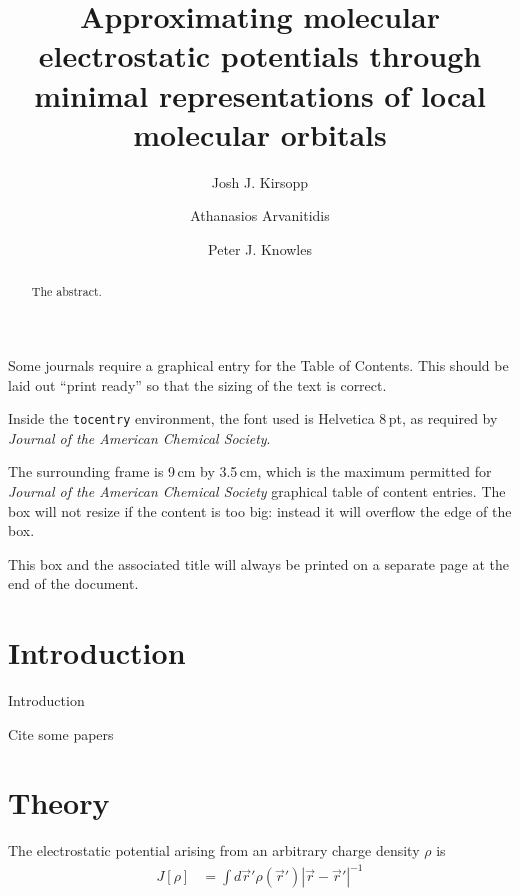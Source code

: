 \documentclass[journal=jacsat,manuscript=article]{achemso}
\author{Josh J. Kirsopp}
\author{Athanasios Arvanitidis}
\author{Peter J. Knowles}
\affiliation[Cardiff University]
{School of Chemistry, Cardiff University, Cardiff CF10 3AT, United Kingdom}
\title[Orbital-fitted density]
  {Approximating molecular electrostatic potentials through minimal representations of local molecular orbitals}
\begin{document}
\begin{tocentry}

Some journals require a graphical entry for the Table of Contents.
This should be laid out ``print ready'' so that the sizing of the
text is correct.

Inside the \texttt{tocentry} environment, the font used is Helvetica
8\,pt, as required by \emph{Journal of the American Chemical
Society}.

The surrounding frame is 9\,cm by 3.5\,cm, which is the maximum
permitted for  \emph{Journal of the American Chemical Society}
graphical table of content entries. The box will not resize if the
content is too big: instead it will overflow the edge of the box.

This box and the associated title will always be printed on a
separate page at the end of the document.

\end{tocentry}

\begin{abstract}
  The abstract.
\end{abstract}

\section{Introduction}
Introduction

Cite some papers\cite{Knizia2015}

\section{Theory}

The electrostatic potential arising from an arbitrary charge density $\rho$ is
\begin{align}
    J[\rho] &= \int d\vec r' \rho(\vec r') |\vec r-\vec r'|^{-1}
\end{align}
\end{document}
